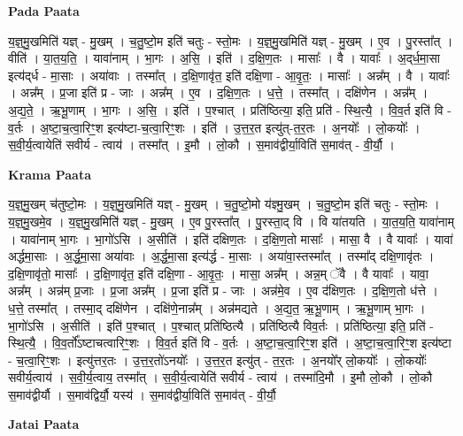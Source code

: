 \documentclass[17pt]{extarticle}
\begin{document}
\textbf{Pada Paata} \newline

य॒ज्ञ्॒मु॒खमिति॑ यज्ञ् - मु॒खम् । च॒तु॒ष्टो॒म इति॑ चतुः - स्तो॒मः । य॒ज्ञ्॒मु॒खमिति॑ यज्ञ् - मु॒खम् । ए॒व । पु॒रस्ता᳚त् । वीति॑ । या॒त॒य॒ति॒ । यावा॑नाम् । भा॒गः । अ॒सि॒ । इति॑ । द॒क्षि॒ण॒तः । मासाः᳚ । वै । यावाः᳚ । अ॒द्‌र्ध॒मा॒सा इत्य॑द्‌र्ध - मा॒साः । अया॑वाः । तस्मा᳚त् । द॒क्षि॒णावृ॑त॒ इति॑ दक्षि॒णा - आ॒वृ॒तः॒ । मासाः᳚ । अन्न᳚म् । वै । यावाः᳚ । अन्न᳚म् । प्र॒जा इति॑ प्र - जाः । अन्न᳚म् । ए॒व । द॒क्षि॒ण॒तः । ध॒त्ते॒ । तस्मा᳚त् । दक्षि॑णेन । अन्न᳚म् । अ॒द्य॒ते॒ । ऋ॒भू॒णाम् । भा॒गः । अ॒सि॒ । इति॑ । प॒श्चात् । प्रति॑ष्ठित्या॒ इति॒ प्रति॑ - स्थि॒त्यै॒ । वि॒व॒र्त इति॑ वि - व॒र्तः । अ॒ष्टा॒च॒त्वा॒रिꣳ॒॒श इत्य॑ष्टा-च॒त्वा॒रिꣳ॒॒शः । इति॑ । उ॒त्त॒र॒त इत्यु॑त्-त॒र॒तः । अ॒नयोः᳚ । लो॒कयोः᳚ । स॒वी॒र्य॒त्वायेति॑ सवीर्य - त्वाय॑ । तस्मा᳚त् । इ॒मौ । लो॒कौ । स॒माव॑द्वीर्या॒विति॑ स॒माव॑त् - वी॒र्यौ॒ ।  \newline


\textbf{Krama Paata} \newline

य॒ज्ञ्॒मु॒खम् च॑तुष्टो॒मः । य॒ज्ञ्॒मु॒खमिति॑ यज्ञ् - मु॒खम् । च॒तु॒ष्टो॒मो य॑ज्ञ्मु॒खम् । च॒तु॒ष्टो॒म इति॑ चतुः - स्तो॒मः । य॒ज्ञ्॒मु॒खमे॒व । य॒ज्ञ्॒मु॒खमिति॑ यज्ञ् - मु॒खम् । 
ए॒व पु॒रस्ता᳚त् । पु॒रस्ता॒द् वि । वि या॑तयति । या॒त॒य॒ति॒ यावा॑नाम् । यावा॑नाम् भा॒गः । भा॒गो॑ऽसि । अ॒सीति॑ । इति॑ दक्षिण॒तः । द॒क्षि॒ण॒तो मासाः᳚ । मासा॒ वै । वै यावाः᳚ । यावा॑ अर्द्धमा॒साः । अ॒र्द्ध॒मा॒सा अया॑वाः । अ॒र्द्ध॒मा॒सा इत्य॑र्द्ध - मा॒साः । अया॑वा॒स्तस्मा᳚त् । तस्मा᳚द् दक्षि॒णावृ॑तः । द॒क्षि॒णावृ॑तो॒ मासाः᳚ । द॒क्षि॒णावृ॑त॒ इति॑ दक्षि॒णा - आ॒वृ॒तः॒ । मासा॒ अन्न᳚म् । अन्न॒म् ॅवै । वै यावाः᳚ । यावा॒ अन्न᳚म् । अन्न॑म् प्र॒जाः । प्र॒जा अन्न᳚म् । प्र॒जा इति॑ प्र - जाः । अन्न॑मे॒व । ए॒व द॑क्षिण॒तः । द॒क्षि॒ण॒तो ध॑त्ते । ध॒त्ते॒ तस्मा᳚त् । तस्मा॒द् दक्षि॑णेन । दक्षि॑णे॒नान्न᳚म् । अन्न॑मद्यते । अ॒द्य॒त॒ ऋ॒भू॒णाम् । ऋ॒भू॒णाम् भा॒गः । भा॒गो॑ऽसि । अ॒सीति॑ । इति॑ प॒श्चात् । प॒श्चात् प्रति॑ष्ठित्यै । प्रति॑ष्ठित्यै विव॒र्तः । प्रति॑ष्ठित्या॒ इति॒ प्रति॑ - स्थि॒त्यै॒ । वि॒व॒र्तो᳚ऽष्टाचत्वारिꣳ॒॒शः । वि॒व॒र्त इति॑ वि - व॒र्तः । अ॒ष्टा॒च॒त्वा॒रिꣳ॒॒श इति॑ । अ॒ष्टा॒च॒त्वा॒रिꣳ॒॒श इत्य॑ष्टा - च॒त्वा॒रिꣳ॒॒शः । इत्यु॑त्तर॒तः । उ॒त्त॒र॒तो॑ऽनयोः᳚ । उ॒त्त॒र॒त इत्यु॑त् - त॒र॒तः । अ॒नयो᳚र् लो॒कयोः᳚ । लो॒कयोः᳚ सवीर्य॒त्वाय॑ । स॒वी॒र्य॒त्वाय॒ तस्मा᳚त् । स॒वी॒र्य॒त्वायेति॑ सवीर्य - त्वाय॑ । तस्मा॑दि॒मौ । इ॒मौ लो॒कौ । लो॒कौ स॒माव॑द्वीर्यौ । स॒माव॑द्विर्यौ॒ यस्य॑ । स॒माव॑द्वीर्या॒विति॑ स॒माव॑त् - वी॒र्यौ॒ \newline

\textbf{Jatai Paata} \newline
\end{document}
